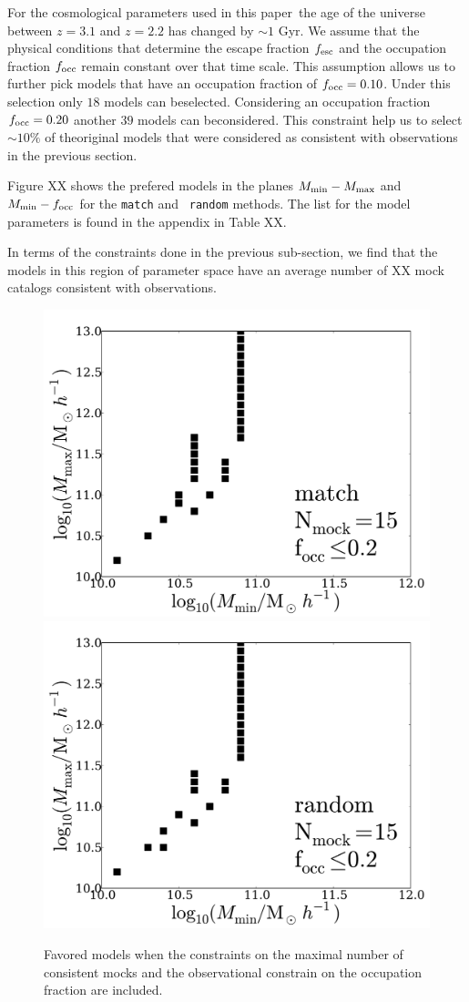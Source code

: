 \documentclass[usenatbib]{mn2e}
\newcommand{\documentname}{paper~}
\begin{document}
For the cosmological parameters used in this \documentname the age of
the universe between $z=3.1$ and $z=2.2$ has changed by $\sim 1$
Gyr. We assume that the physical conditions that determine the escape
fraction $f_{\rm esc}$ and the occupation fraction $f_{\rm  occ}$
remain constant over that time scale. This assumption allows us to
further pick models that have an occupation fraction of $f_{\rm
  occ}=0.10$. Under this selection only $18$ models can
beselected. Considering an occupation fraction $f_{\rm occ}=0.20$
another $39$ models can beconsidered. This constraint help us to
select $\sim 10\%$ of theoriginal models that were considered as
consistent with observations in the previous section. 

Figure XX shows the prefered models in the planes $M_{\rm min}-M_{\rm
  max}$ and $M_{\rm min}-f_{\rm occ}$ for the {\tt match} and {\tt
  random} methods. The list for the model parameters is found in the
appendix in Table XX.  

In terms of the constraints done in the previous sub-section, we find
that the models in this region of parameter space have an average
number of XX mock catalogs consistent with observations. 


\begin{figure}
\begin{center}
\includegraphics[width=0.46\linewidth,angle=0]{./plots/Fig5_match_mass_mock_and_f_occ.pdf}
\hspace{5mm}
\includegraphics[width=0.46\linewidth,angle=0]{./plots/Fig5_random_mass_mock_and_f_occ.pdf}
\end{center} 
\caption{Favored models when the constraints on the maximal number of
  consistent mocks and the observational constrain on the occupation
  fraction are included.
  \label{figure:mock_and_f_occ}}  
\end{figure}
\end{document}
